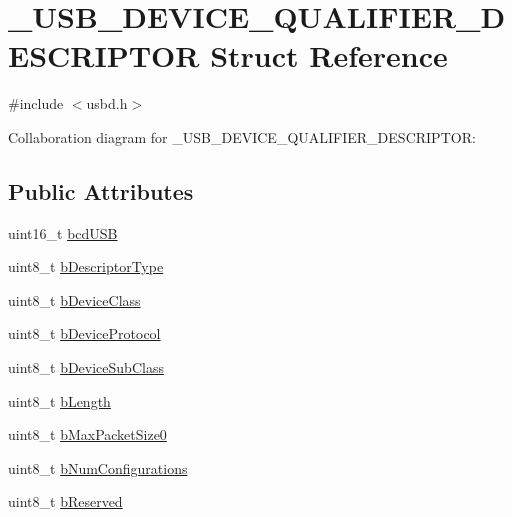 \hypertarget{struct__USB__DEVICE__QUALIFIER__DESCRIPTOR}{}\section{\+\_\+\+U\+S\+B\+\_\+\+D\+E\+V\+I\+C\+E\+\_\+\+Q\+U\+A\+L\+I\+F\+I\+E\+R\+\_\+\+D\+E\+S\+C\+R\+I\+P\+T\+OR Struct Reference}
\label{struct__USB__DEVICE__QUALIFIER__DESCRIPTOR}


{\ttfamily \#include $<$usbd.\+h$>$}



Collaboration diagram for \+\_\+\+U\+S\+B\+\_\+\+D\+E\+V\+I\+C\+E\+\_\+\+Q\+U\+A\+L\+I\+F\+I\+E\+R\+\_\+\+D\+E\+S\+C\+R\+I\+P\+T\+OR\+:
\subsection*{Public Attributes}
\begin{DoxyCompactItemize}
\item 
uint16\+\_\+t \hyperlink{struct__USB__DEVICE__QUALIFIER__DESCRIPTOR_a5ed7e66481d8d3a56ae6a9a673cb36ce}{bcd\+U\+SB}
\item 
uint8\+\_\+t \hyperlink{struct__USB__DEVICE__QUALIFIER__DESCRIPTOR_a2dbcdc73ca5a8b7ad93662fe9fe51f6a}{b\+Descriptor\+Type}
\item 
uint8\+\_\+t \hyperlink{struct__USB__DEVICE__QUALIFIER__DESCRIPTOR_a535ab966fc5c44325c418d62936bd36f}{b\+Device\+Class}
\item 
uint8\+\_\+t \hyperlink{struct__USB__DEVICE__QUALIFIER__DESCRIPTOR_a89f31d3447ba230c9286ef8b17d07d6a}{b\+Device\+Protocol}
\item 
uint8\+\_\+t \hyperlink{struct__USB__DEVICE__QUALIFIER__DESCRIPTOR_ad9f1b4ac2f91733fa2a7aaa59c83827d}{b\+Device\+Sub\+Class}
\item 
uint8\+\_\+t \hyperlink{struct__USB__DEVICE__QUALIFIER__DESCRIPTOR_a48a7d7d23c8a44054246cabb6d61b784}{b\+Length}
\item 
uint8\+\_\+t \hyperlink{struct__USB__DEVICE__QUALIFIER__DESCRIPTOR_aa2d6b38e770b0309eab331a31b693f8b}{b\+Max\+Packet\+Size0}
\item 
uint8\+\_\+t \hyperlink{struct__USB__DEVICE__QUALIFIER__DESCRIPTOR_a12db8a81d507d7019204c54867e460fd}{b\+Num\+Configurations}
\item 
uint8\+\_\+t \hyperlink{struct__USB__DEVICE__QUALIFIER__DESCRIPTOR_a8d9c5ddf2a109289513b43ce1effb198}{b\+Reserved}
\end{DoxyCompactItemize}


